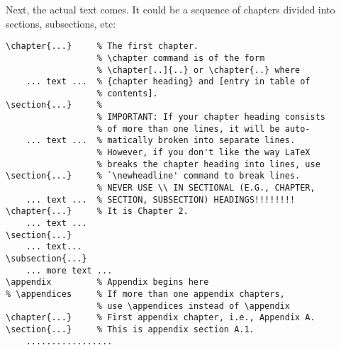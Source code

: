 \documentclass[12pt]{report} %
\theoremstyle{definition}
\theoremstyle{remark}
\begin{document}
Next, the actual text comes. It could be a sequence of 
chapters divided into sections, subsections, etc:
\begin{verbatim}
\chapter{...}     % The first chapter.
                  % \chapter command is of the form
                  % \chapter[..]{..} or \chapter{..} where
    ... text ...  % {chapter heading} and [entry in table of
                  % contents].
\section{...}     %
                  % IMPORTANT: If your chapter heading consists
                  % of more than one lines, it will be auto-
    ... text ...  % matically broken into separate lines.
                  % However, if you don't like the way LaTeX
                  % breaks the chapter heading into lines, use
\section{...}     % `\newheadline' command to break lines.
                  % NEVER USE \\ IN SECTIONAL (E.G., CHAPTER,
    ... text ...  % SECTION, SUBSECTION) HEADINGS!!!!!!!!
\chapter{...}     % It is Chapter 2.
    ... text ...
\section{...}
    ... text...
\subsection{...}
    ... more text ...
\appendix         % Appendix begins here
% \appendices     % If more than one appendix chapters,
                  % use \appendices instead of \appendix
\chapter{...}     % First appendix chapter, i.e., Appendix A.
\section{...}     % This is appendix section A.1.
    .................
\end{verbatim}
\end{document}
